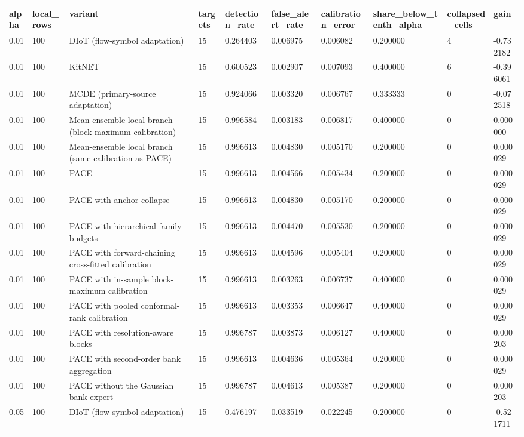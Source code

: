 \begin{tabular}{llllllllll}
\toprule
alpha & local\_rows & variant & targets & detection\_rate & false\_alert\_rate & calibration\_error & share\_below\_tenth\_alpha & collapsed\_cells & gain \\
\midrule
0.01 & 100 & DIoT (flow-symbol adaptation) & 15 & 0.264403 & 0.006975 & 0.006082 & 0.200000 & 4 & -0.732182 \\
0.01 & 100 & KitNET & 15 & 0.600523 & 0.002907 & 0.007093 & 0.400000 & 6 & -0.396061 \\
0.01 & 100 & MCDE (primary-source adaptation) & 15 & 0.924066 & 0.003320 & 0.006767 & 0.333333 & 0 & -0.072518 \\
0.01 & 100 & Mean-ensemble local branch (block-maximum calibration) & 15 & 0.996584 & 0.003183 & 0.006817 & 0.400000 & 0 & 0.000000 \\
0.01 & 100 & Mean-ensemble local branch (same calibration as PACE) & 15 & 0.996613 & 0.004830 & 0.005170 & 0.200000 & 0 & 0.000029 \\
0.01 & 100 & PACE & 15 & 0.996613 & 0.004566 & 0.005434 & 0.200000 & 0 & 0.000029 \\
0.01 & 100 & PACE with anchor collapse & 15 & 0.996613 & 0.004830 & 0.005170 & 0.200000 & 0 & 0.000029 \\
0.01 & 100 & PACE with hierarchical family budgets & 15 & 0.996613 & 0.004470 & 0.005530 & 0.200000 & 0 & 0.000029 \\
0.01 & 100 & PACE with forward-chaining cross-fitted calibration & 15 & 0.996613 & 0.004596 & 0.005404 & 0.200000 & 0 & 0.000029 \\
0.01 & 100 & PACE with in-sample block-maximum calibration & 15 & 0.996613 & 0.003263 & 0.006737 & 0.400000 & 0 & 0.000029 \\
0.01 & 100 & PACE with pooled conformal-rank calibration & 15 & 0.996613 & 0.003353 & 0.006647 & 0.400000 & 0 & 0.000029 \\
0.01 & 100 & PACE with resolution-aware blocks & 15 & 0.996787 & 0.003873 & 0.006127 & 0.400000 & 0 & 0.000203 \\
0.01 & 100 & PACE with second-order bank aggregation & 15 & 0.996613 & 0.004636 & 0.005364 & 0.200000 & 0 & 0.000029 \\
0.01 & 100 & PACE without the Gaussian bank expert & 15 & 0.996787 & 0.004613 & 0.005387 & 0.200000 & 0 & 0.000203 \\
0.05 & 100 & DIoT (flow-symbol adaptation) & 15 & 0.476197 & 0.033519 & 0.022245 & 0.200000 & 0 & -0.521711 \\

\end{tabular}
